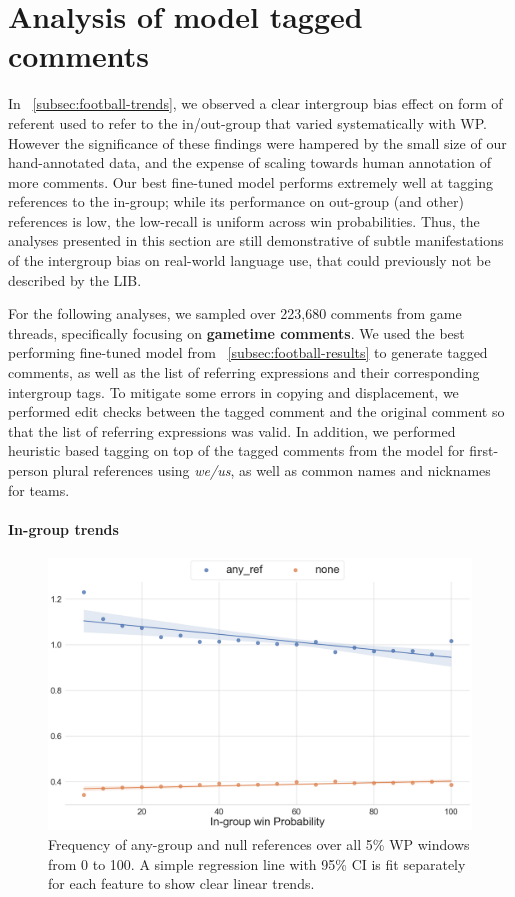 \section{Analysis of model tagged comments}
\label{sec:football-analysis}

In \textsection~\ref{subsec:football-trends}, we observed a clear intergroup bias effect on form of referent used to refer to the in/out-group that varied systematically with WP. However the significance of these findings were hampered by the small size of our hand-annotated data, and the expense of scaling towards human annotation of more comments. Our best fine-tuned model performs extremely well at tagging references to the in-group; while its performance on out-group (and other) references is low, the low-recall is uniform across win probabilities. Thus, the analyses presented in this section are still demonstrative of subtle manifestations of the intergroup bias on real-world language use, that could previously not be described by the LIB.

For the following analyses, we sampled over 223,680 comments from game threads, specifically focusing on \textbf{gametime comments}. We used the best performing fine-tuned model from \textsection~\ref{subsec:football-results} to generate tagged comments, as well as the list of referring expressions and their corresponding intergroup tags. To mitigate some errors in copying and displacement, we performed edit checks between the tagged comment and the original comment so that the list of referring expressions was valid. In addition, we performed heuristic based tagging on top of the tagged comments from the model for first-person plural references using \emph{we/us}, as well as common names and nicknames for teams.

\paragraph{In-group trends}

\begin{figure}[t]
    \centering
    \includegraphics[width=\linewidth]{figures/trends-1.png}
    \caption{Frequency of any-group and null references over all 5\% WP windows from 0 to 100. A simple regression line with 95\% CI is fit separately for each feature to show clear linear trends.}
    \label{fig:trends-1}
\end{figure}

